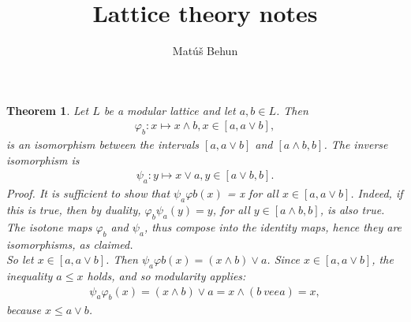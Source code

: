 \documentclass[a4paper,12pt,oneside]{report}%
\author{Mat\'u\v{s} Behun}
\title{Lattice theory notes}
\newtheorem{theorem}{Theorem}
\begin{document}
\begin{theorem}
Let $L$ be a modular lattice and let $a,b \in L$. Then
    \begin{align*}
        \varphi_{b}: x \mapsto x \wedge b, x \in [a, a \vee b],
    \end{align*}
is an isomorphism between the intervals $[a, a \vee b]$ and $[a \wedge b, b]$.
The inverse isomorphism is
    \begin{align*}
        \psi_{a}: y \mapsto x \vee a, y \in [a \vee b, b].
    \end{align*}
\emph{Proof.} It is sufficient to show that $\psi_{a}\varphi{b}(x)$ = x for
all $x \in [a, a \vee b]$.
Indeed, if this is true, then by duality, $\varphi_{b}\psi_{a}(y) = y$, for all 
    $y \in [a \wedge b, b]$, is also true.
The isotone maps $\varphi_{b}$ and $\psi_{a}$,  thus compose into the identity maps,
hence they are isomorphisms, as claimed. \\
So let $x \in [a, a \vee b]$.
Then $\psi_{a}\varphi{b}(x) = (x \wedge b) \vee a$.
Since $x \in [a, a \vee b]$, the inequality $a \leq x$ holds, and so modularity 
    applies:
    \begin{align*}
        \psi_{a}\varphi_{b}(x) = ( x \wedge b) \vee a = x \wedge ( b \ vee a ) = x,
    \end{align*}
because $x \leq a \vee b$. \qedsymbol
\end{theorem}
\end{document}
